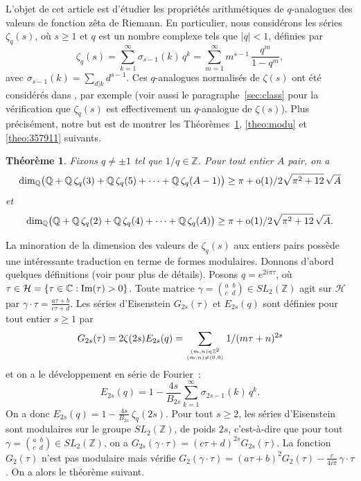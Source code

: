 \documentclass[12pt]{amsart}
\newcommand{\io}{\infty}
\newcommand{\dis}{\displaystyle}
\newtheorem{theo}{Th{\'e}or{\`e}me}
\theoremstyle{remark}
\numberwithin{equation}{section}
\begin{document}
L'objet de cet article est d'{\'e}tudier les propri{\'e}t{\'e}s
arithm{\'e}tiques de $q$-analogues des valeurs 
de fonction z{\^e}ta de Riemann. En particulier, 
nous consid{\'e}rons les s{\'e}ries $\zeta_q(s)$, 
o{\`u} $s\ge1$ et $q$ est un nombre complexe tels que 
$\vert q\vert <1$, d{\'e}finies par
\begin{equation} \label{eq:zetaq}
\zeta_q(s)=\sum_{k=1}^{\io} \sigma_{s-1}(k)\,q^k=
\sum_{m=1}^{\io} m^ {s-1}\,\frac{q^{m}}{1-q^{m}},
\end{equation}
avec $\sigma_{s-1}(k)=\sum_{d\vert k}d^{s-1}$.
Ces $q$-analogues normalis{\'e}s 
de $\zeta(s)$ ont {\'e}t{\'e} consid{\'e}r{\'e}s dans \cite{jap, zud5}, par
exemple
(voir aussi le
paragraphe~\ref{sec:class} pour la v{\'e}rification que $\zeta_q(s)$
est effectivement un $q$-analogue de $\zeta(s)$). Plus pr{\'e}cis{\'e}ment, notre but est de 
montrer les Th{\'e}or{\`e}mes~\ref{theo:dimietp}, \ref{theo:modu} et 
\ref{theo:357911} suivants. 

\begin{theo} \label{theo:dimietp}
Fixons $q\not =\pm1$ tel que $1/q\in\mathbb{Z}$. Pour tout entier 
$A$ pair, 
on a 
$$
\dim_{\mathbb{Q}} \bigl(\mathbb{Q}+\mathbb{Q}\, 
\zeta_q(3)+ \mathbb{Q} \,\zeta_q(5)+ \cdots +
\mathbb{Q}\, \zeta_q(A-1)\bigr)\ge 
\frac{\pi+\textup{o}(1)}{2\sqrt{\pi^2+12}}\,\sqrt{A}
$$
et 
$$
\dim_{\mathbb{Q}} \bigl(\mathbb{Q}+\mathbb{Q}\, 
\zeta_q(2)+ \mathbb{Q} \,\zeta_q(4)+ \cdots +
\mathbb{Q} \,\zeta_q(A)\bigr)\ge 
\frac{\pi+\textup{o}(1)}{2\sqrt{\pi^2+12}}\,\sqrt{A}.
$$
\end{theo}

La minoration 
de la dimension des valeurs de $\zeta_q(s)$ aux entiers pairs 
poss{\`e}de une int{\'e}\-res\-san\-te traduction en terme de formes modulaires. 
Donnons d'abord 
quelques d{\'e}finitions (voir \cite{jps} pour plus de
d{\'e}tails).  
Posons $q= e^{2i\pi \tau}$, o{\`u} 
$\tau\in\mathcal{H}=\{\tau\in \mathbb{C} : \textup{Im}(\tau)>0\}$.   
Toute matrice 
$\dis\gamma=\binom{a\;\;b}{c\;\;d}\in SL_2(\mathbb{Z})$ agit sur $\mathcal{H}$
par 
$\dis \gamma\cdot\tau=\frac{a\tau+b}{c\tau+d}$. 
Les s{\'e}ries d'Eisenstein $G_{2s}(\tau)$ et $E_{2s}(q)$ sont d{\'e}finies
pour tout 
entier $s\ge 1$ par 
$$
G_{2s}(\tau)=2\zeta(2s)E_{2s}(q)=
\sum_{{(m,n)\in\mathbb{Z}^2\atop (m,n)\neq(0,0)}}\frac{1}{(m\tau+n)^{2s}}
$$
et on a le d{\'e}veloppement en s{\'e}rie de Fourier~:
$$
E_{2s}(q)
=1-\frac{4s}{B_{2s}}\sum_{k=1}^{\io} \sigma_{2s-1}(k)\,q^k.
$$
On a donc 
$E_{2s}(q)=1-\frac{4s}{B_{2s}}\,\zeta_q(2s)$.  
Pour tout $s\ge 2$, les s{\'e}ries d'Eisenstein sont 
modulaires sur le groupe 
$SL_2(\mathbb{Z})$, de poids $2s$, c'est-{\`a}-dire que pour tout $\dis\gamma=
\binom{a\;\;b}{c\;\;d}\in SL_2(\mathbb{Z})$, on a
$G_{2s}(\gamma \cdot\tau)=(c\tau+d)^{2s}G_{2s}(\tau)$.  
La fonction $G_2(\tau)$ n'est pas modulaire mais v{\'e}rifie 
$\dis G_2(\gamma \cdot \tau)=
(a\tau +b)^2G_2(\tau)-\frac{c}{4i\pi}\,\gamma\cdot\tau$. 
On a alors le th{\'e}or{\`e}me suivant.
\end{document}
